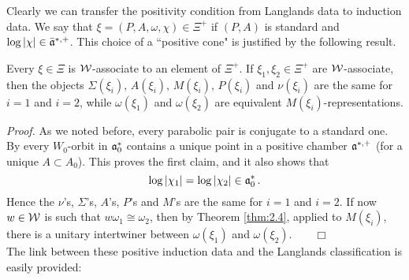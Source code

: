 Clearly we can transfer the positivity condition from Langlands data to induction data. 
We say that $\xi = (P,A,\omega ,\chi ) \in \Xi^+$ if $(P,A)$ is standard and 
$\log |\chi| \in \bar{\mathfrak a}^{*,+}$. This choice of a ``positive cone" is justified 
by the following result.

\begin{lem}\label{lem:2.10}
Every $\xi \in \Xi$ is $\mathcal W$-associate to an element of $\Xi^+$.
If $\xi_1 , \xi_2 \in \Xi^+$ are $\mathcal W$-associate, then the
objects $\Sigma (\xi_i ) ,\, A(\xi_i ) ,\, M(\xi_i ) ,\, P(\xi_i )$ and 
$\nu (\xi_i )$ are the same for $i=1$ and $i=2$, while $\omega (\xi_1 )$ 
and $\omega (\xi_2 )$ are equivalent $M(\xi_i )$-representations.
\end{lem}
\emph{Proof.} As we noted before, every parabolic pair is
conjugate to a standard one. By \cite[Section 1.15]{Hum} every
$W_0$-orbit in $\mathfrak a_0^*$ contains a unique point in a positive
chamber $\mathfrak a^{*,+}$ (for a unique $A \subset A_0$).  This proves
the first claim, and it also shows that
\begin{equation}
\log |\chi_1 | = \log |\chi_2 | \in \mathfrak a_0^* \,.
\end{equation}
Hence the $\nu$'s, $\Sigma$'s, $A$'s, $P$'s and $M$'s are the same
for $i=1$ and $i=2$. If now $w \in \mathcal W$ is such that $w \omega_1
\cong \omega_2$, then by Theorem \ref{thm:2.4}, applied to
$M(\xi_i )$, there is a unitary intertwiner between $\omega (\xi_1
)$ and $\omega (\xi_2 ). \qquad \Box$
\\[2mm]

The link between these positive induction data and the Langlands 
classification is easily provided:

